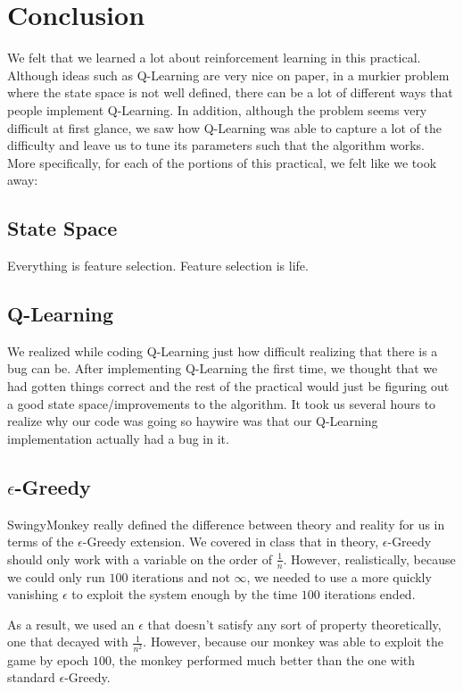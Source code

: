 \documentclass[10pt, oneside]{article}
\begin{document}
\section{Conclusion}
We felt that we learned a lot about reinforcement learning in this practical. Although ideas such as Q-Learning are very nice on paper, in a murkier problem where the state space is not well defined, there can be a lot of different ways that people implement Q-Learning. In addition, although the problem seems very difficult at first glance, we saw how Q-Learning was able to capture a lot of the difficulty and leave us to tune its parameters such that the algorithm works. More specifically, for each of the portions of this practical, we felt like we took away:

\subsection{State Space}
Everything is feature selection. Feature selection is life.

\subsection{Q-Learning}
We realized while coding Q-Learning just how difficult realizing that there is a bug can be. After implementing Q-Learning the first time, we thought that we had gotten things correct and the rest of the practical would just be figuring out a good state space/improvements to the algorithm. It took us several hours to realize why our code was going so haywire was that our Q-Learning implementation actually had a bug in it.

\subsection{$\epsilon$-Greedy}
SwingyMonkey really defined the difference between theory and reality for us in terms of the $\epsilon$-Greedy extension. We covered in class that in theory, $\epsilon$-Greedy should only work with a variable on the order of $\frac{1}{n}$. However, realistically, because we could only run $100$ iterations and not $\infty$, we needed to use a more quickly vanishing $\epsilon$ to exploit the system enough by the time $100$ iterations ended.

As a result, we used an $\epsilon$ that doesn't satisfy any sort of property theoretically, one that decayed with $\frac{1}{n^2}$. However, because our monkey was able to exploit the game by epoch $100$, the monkey performed much better than the one with standard $\epsilon$-Greedy.
\end{document}
